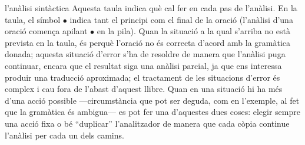 \begin{persabermes}{l'anàlisi sintàctica}
  Aquesta taula indica què cal fer en cada pas de l'anàlisi. En la
  taula, el símbol $\bullet$ indica tant el principi com el final de
  la oració (l'anàlisi d'una oració comença apilant $\bullet$ en la
  pila). Quan la situació a la qual s'arriba no està prevista en la
  taula, és perquè l'oració no és correcta d'acord amb la gramàtica
  donada; aquesta situació d'error s'ha de resoldre de manera que
  l'anàlisi puga continuar, encara que el resultat siga una anàlisi
  parcial, ja que ens interessa produir una traducció aproximada; el
  tractament de les situacions d'error és complex i cau fora de
  l'abast d'aquest llibre. Quan en una situació hi ha més d'una acció
  possible ---circumstància que pot ser deguda, com en l'exemple, al
  fet que la gramàtica és ambigua--- es pot fer una d'aquestes dues
  coses: elegir sempre una acció fixa o bé ``duplicar'' l'analitzador
  de manera que cada còpia continue l'anàlisi per cada un dels camins.



\end{persabermes}
